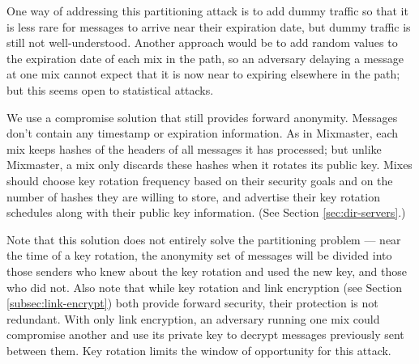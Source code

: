 \documentclass[times,10pt,twocolumn]{article}
\begin{document}

One way of addressing this partitioning attack is to add dummy traffic
so that it is less rare for messages to arrive near their expiration date,
but dummy traffic is still not well-understood. Another approach would
be to add random values to the expiration date of each mix in the path,
so an adversary delaying a message at one mix cannot expect that it
is now near to expiring elsewhere in the path; but this seems open to
statistical attacks.


We use a compromise solution that still provides forward anonymity.  Messages
don't contain any timestamp or expiration information. As in Mixmaster, each
mix keeps hashes of the headers of all messages it has processed; but unlike
Mixmaster, a mix only discards these hashes when it rotates its public
key. Mixes
should choose key rotation frequency based on their security goals and on the
number of hashes they are willing to store, and advertise their key rotation
schedules along with their public key information.  (See Section
\ref{sec:dir-servers}.)

Note that this solution does not entirely solve the partitioning problem
--- near the time of a key rotation, the anonymity set of messages will
be divided into those senders who knew about the key rotation and used
the new key, and those who did not. %
Also note that while key rotation and link encryption (see Section
\ref{subsec:link-encrypt}) both provide forward security, their protection
is not redundant. With only link encryption, an adversary running
one mix could compromise another and use its private key to decrypt
messages previously sent between them. Key rotation limits the window
of opportunity for this attack.

\end{document}

